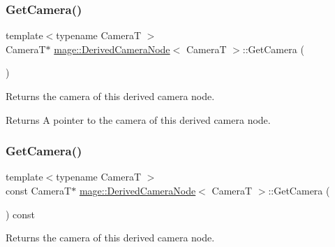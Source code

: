 \hypertarget{classmage_1_1_derived_camera_node_a423d9e416aec8ade92d0d2211d40de39}{}\label{classmage_1_1_derived_camera_node_a423d9e416aec8ade92d0d2211d40de39} 
\subsubsection{\texorpdfstring{Get\+Camera()}{GetCamera()}\hspace{0.1cm}{\footnotesize\ttfamily [1/2]}}
{\footnotesize\ttfamily template$<$typename CameraT $>$ \\
CameraT$\ast$ \hyperlink{classmage_1_1_derived_camera_node}{mage\+::\+Derived\+Camera\+Node}$<$ CameraT $>$\+::Get\+Camera (\begin{DoxyParamCaption}{ }\end{DoxyParamCaption})\hspace{0.3cm}{\ttfamily [noexcept]}}

Returns the camera of this derived camera node.

\begin{DoxyReturn}{Returns}
A pointer to the camera of this derived camera node. 
\end{DoxyReturn}
\hypertarget{classmage_1_1_derived_camera_node_aef2db8d343aeebc95c433150e234481a}{}\label{classmage_1_1_derived_camera_node_aef2db8d343aeebc95c433150e234481a} 
\subsubsection{\texorpdfstring{Get\+Camera()}{GetCamera()}\hspace{0.1cm}{\footnotesize\ttfamily [2/2]}}
{\footnotesize\ttfamily template$<$typename CameraT $>$ \\
const CameraT$\ast$ \hyperlink{classmage_1_1_derived_camera_node}{mage\+::\+Derived\+Camera\+Node}$<$ CameraT $>$\+::Get\+Camera (\begin{DoxyParamCaption}{ }\end{DoxyParamCaption}) const\hspace{0.3cm}{\ttfamily [noexcept]}}

Returns the camera of this derived camera node.

